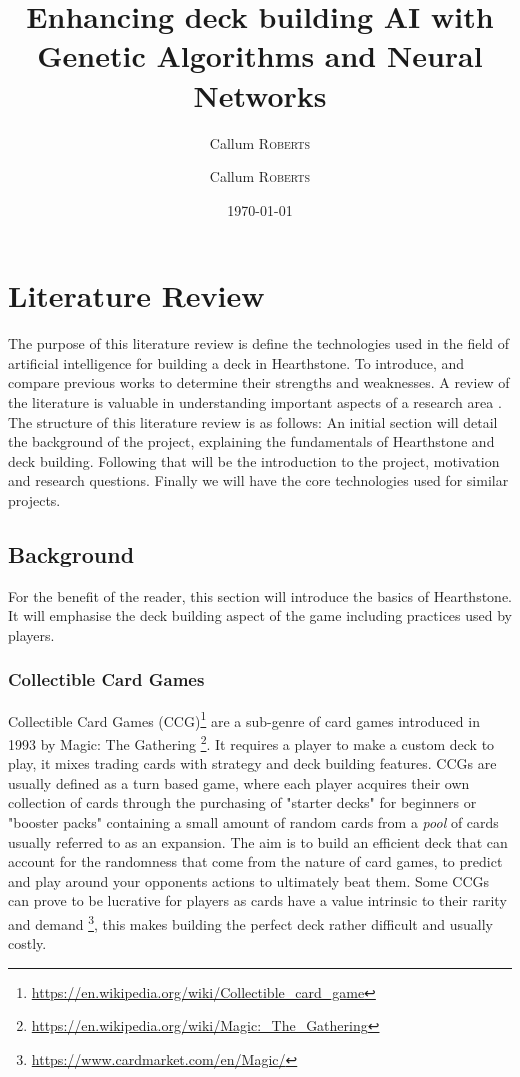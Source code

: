 \documentclass{report}
\title{Enhancing deck building AI with Genetic Algorithms and Neural Networks} %
\author{Callum \textsc{Roberts}} %
\author{Callum \textsc{Roberts}} %
\date{\today} %
\begin{document}
\maketitle %



\chapter{Literature Review}
The purpose of this literature review is define the technologies used in the field of artificial intelligence for building a deck in Hearthstone. To introduce, and compare previous works to determine their strengths and weaknesses. A review of the literature is valuable in understanding important aspects of a research area \cite{}. The structure of this literature review is as follows: An initial section will detail the background of the project, explaining the fundamentals of Hearthstone and deck building. Following that will be the introduction to the project,  motivation and research questions. Finally we will have the core technologies used for similar projects.
\section{Background}
	For the benefit of the reader, this section will introduce the basics of Hearthstone. It will emphasise the deck building aspect of the game including practices used by players.  
\subsection{Collectible Card Games}
	Collectible Card Games (CCG)\footnote{\url{https://en.wikipedia.org/wiki/Collectible_card_game}} are a sub-genre of card games introduced in 1993 by Magic: The Gathering \footnote{\url{https://en.wikipedia.org/wiki/Magic:_The_Gathering}}. It requires a player to make a custom deck to play, it mixes trading cards with strategy and deck building features. CCGs are usually defined as a turn based game, where each player acquires their own collection of cards through the purchasing of "starter decks" for beginners or "booster packs" containing a small amount of random cards from a {\it{pool}} of cards usually referred to as an expansion. The aim is to build an efficient deck that can account for the randomness that come from the nature of card games, to predict and play around your opponents actions to ultimately beat them. Some CCGs can prove to be lucrative for players as cards have a value intrinsic to their rarity and demand \footnote{\url{https://www.cardmarket.com/en/Magic/}}, this makes building the perfect deck rather difficult and usually costly.
\end{document}
